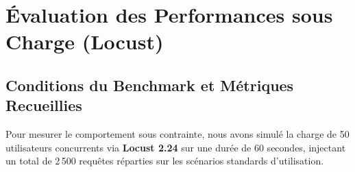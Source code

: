 \section{\'Evaluation des Performances sous Charge (Locust)}
\subsection{Conditions du Benchmark et M\'etriques Recueillies}
\par Pour mesurer le comportement sous contrainte, nous avons simul\'e la charge de 50 utilisateurs concurrents via \textbf{Locust 2.24} sur une dur\'ee de 60 secondes, injectant un total de 2\,500 requ\^etes r\'eparties sur les sc\'enarios standards d'utilisation.

\begin{table}[H]
\centering
\caption{M\'etriques de Performance Mesur\'ees sous Charge (50 Utilisateurs Simultan\'es)}
\label{tab:perf_benchmarks}
%
\end{table}

